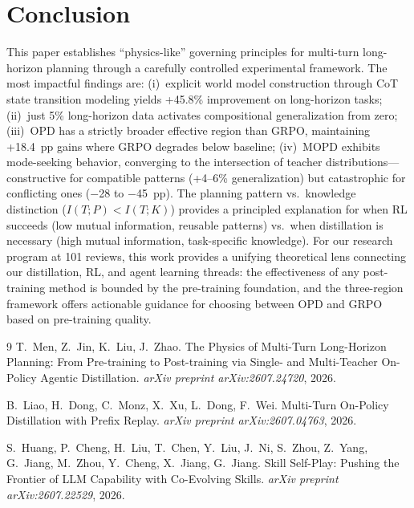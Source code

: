 \documentclass[11pt,a4paper]{article}
\begin{document}
\section{Conclusion}

This paper establishes ``physics-like'' governing principles for multi-turn long-horizon planning through a carefully controlled experimental framework. The most impactful findings are: (i)~explicit world model construction through CoT state transition modeling yields +45.8\% improvement on long-horizon tasks; (ii)~just 5\% long-horizon data activates compositional generalization from zero; (iii)~OPD has a strictly broader effective region than GRPO, maintaining +18.4~pp gains where GRPO degrades below baseline; (iv)~MOPD exhibits mode-seeking behavior, converging to the intersection of teacher distributions---constructive for compatible patterns (+4--6\% generalization) but catastrophic for conflicting ones ($-$28 to $-$45~pp). The planning pattern vs.\ knowledge distinction ($I(T;P) < I(T;K)$) provides a principled explanation for when RL succeeds (low mutual information, reusable patterns) vs.\ when distillation is necessary (high mutual information, task-specific knowledge). For our research program at 101 reviews, this work provides a unifying theoretical lens connecting our distillation, RL, and agent learning threads: the effectiveness of any post-training method is bounded by the pre-training foundation, and the three-region framework offers actionable guidance for choosing between OPD and GRPO based on pre-training quality.


\begin{thebibliography}{9}
T.~Men, Z.~Jin, K.~Liu, J.~Zhao.
\newblock The Physics of Multi-Turn Long-Horizon Planning: From Pre-training to Post-training via Single- and Multi-Teacher On-Policy Agentic Distillation.
\newblock \emph{arXiv preprint arXiv:2607.24720}, 2026.

B.~Liao, H.~Dong, C.~Monz, X.~Xu, L.~Dong, F.~Wei.
\newblock Multi-Turn On-Policy Distillation with Prefix Replay.
\newblock \emph{arXiv preprint arXiv:2607.04763}, 2026.

S.~Huang, P.~Cheng, H.~Liu, T.~Chen, Y.~Liu, J.~Ni, S.~Zhou, Z.~Yang, G.~Jiang, M.~Zhou, Y.~Cheng, X.~Jiang, G.~Jiang.
\newblock Skill Self-Play: Pushing the Frontier of LLM Capability with Co-Evolving Skills.
\newblock \emph{arXiv preprint arXiv:2607.22529}, 2026.
\end{thebibliography}
\end{document}
